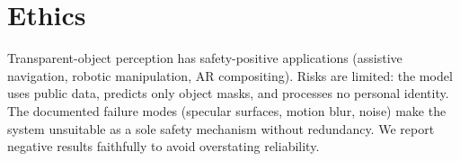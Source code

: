 \section{Ethics}
Transparent-object perception has safety-positive applications (assistive
navigation, robotic manipulation, AR compositing). Risks are limited: the model
uses public data, predicts only object masks, and processes no personal
identity. The documented failure modes (specular surfaces, motion blur, noise)
make the system unsuitable as a sole safety mechanism without redundancy. We
report negative results faithfully to avoid overstating reliability.

